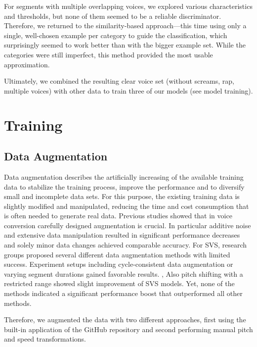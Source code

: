 \documentclass[a4paper]{article}
\begin{document}
	For segments with multiple overlapping voices, we explored various characteristics and thresholds, but none of them seemed to be a reliable discriminator. Therefore, we returned to the similarity-based approach—this time using only a single, well-chosen example per category to guide the classification, which surprisingly seemed to work better than with the bigger example set. While the categories were still imperfect, this method provided the most usable approximation.
	
	Ultimately, we combined the resulting clear voice set (without screams, rap, multiple voices) with other data to train three of our models (see model training).
	
	
	
	
	\newpage
	
	\section{Training}
	
	\subsection{Data Augmentation}
	
	Data augmentation describes the artificially increasing of the available training data to stabilize the training process, improve the performance and to diversify small and incomplete data sets. For this purpose, the existing training data is slightly modified and manipulated, reducing the  time and cost consumption that is often needed to generate real data. Previous studies showed that in voice conversion carefully designed augmentation is crucial. In particular additive noise and extensive data manipulation resulted in significant performance decreases and solely minor data changes achieved comparable accuracy. \cite{Slizovskaia2022}  For SVS, research groups proposed several different data augmentation methods with limited success. Experiment setups including cycle-consistent data augmentation or varying segment durations gained favorable results. \cite{Guo2022},\cite{Zhang2022} Also pitch shifting with a restricted range showed slight improvement of SVS models. \cite{Guo2022} Yet, none of the methods indicated a significant performance boost that outperformed all other methods. 
	
	Therefore, we augmented the data with two different approaches, first using the built-in application of the GitHub repository and second performing manual pitch and speed transformations.
	
\end{document}
